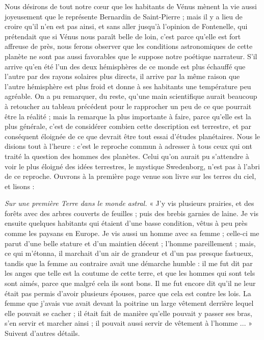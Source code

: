 \documentclass[a4paper, 11pt, oneside]{article}
\begin{document}
Nous désirons de tout notre cœur que les habitants de Vénus mènent la vie aussi joyeusement que le représente Bernardin de Saint-Pierre ; mais il y a lieu de croire qu'il n'en est pas ainsi, et sans aller jusqu'à l'opinion de Fontenelle, qui prétendait que si Vénus nous paraît belle de loin, c'est parce qu'elle est fort affreuse de près, nous ferons observer que les conditions astronomiques de cette planète ne sont pas aussi favorables que le suppose notre poétique narrateur. S'il arrive qu'en été l'un des deux hémisphères de ce monde est plus échauffé que l'autre par des rayons solaires plus directs, il arrive par la même raison que l'autre hémisphère est plus froid et donne à ses habitants une température peu agréable. On a pu remarquer, du reste, qu'une main scientifique aurait beaucoup à retoucher au tableau précédent pour le rapprocher un peu de ce que pourrait être la réalité ; mais la remarque la plus importante à faire, parce qu'elle est la plus générale, c'est de considérer combien cette description est terrestre, et par conséquent éloignée de ce que devrait être tout essai d'études planétaires. Nous le disions tout à l'heure : c'est le reproche commun à adresser à tous ceux qui ont traité la question des hommes des planètes. Celui qu'on aurait pu s'attendre à voir le plus éloigné des idées terrestres, le mystique Swedenborg, n'est pas à l'abri de ce reproche. Ouvrons à la première page venue son livre sur les terres du ciel, et lisons :

\emph{Sur une première Terre dans le monde astral.} « J'y vis plusieurs prairies, et des forêts avec des arbres couverts de feuilles ; puis des brebis garnies de laine. Je vis ensuite quelques habitants qui étaient d'une basse condition, vêtus à peu près comme les paysans en Europe. Je vis aussi un homme avec sa femme ; celle-ci me parut d'une belle stature et d'un maintien décent ; l'homme pareillement ; mais, ce qui m'étonna, il marchait d'un air de grandeur et d'un pas presque fastueux, tandis que la femme au contraire avait une démarche humble : il me fut dit par les anges que telle est la coutume de cette terre, et que les hommes qui sont tels sont aimés, parce que malgré cela ils sont bons. Il me fut encore dit qu'il ne leur était pas permis d'avoir plusieurs épouses, parce que cela est contre les lois. La femme que j'avais vue avait devant la poitrine un large vêtement derrière lequel elle pouvait se cacher ; il était fait de manière qu'elle pouvait y passer ses bras, s'en servir et marcher ainsi ; il pouvait aussi servir de vêtement à l'homme ... » Suivent d'autres détails.
\end{document}
